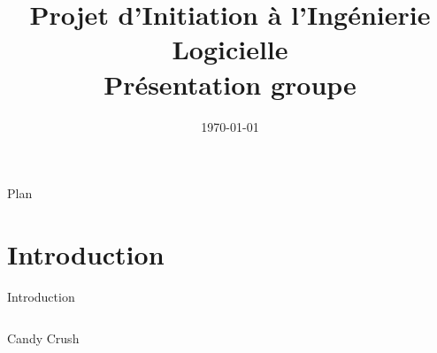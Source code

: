 \documentclass{beamer}
\title[\texorpdfstring{Projet d'Initiation à l'Ingénierie Logicielle}{}]{\texorpdfstring{Projet d'Initiation à l'Ingénierie Logicielle\\Présentation groupe \no 3}{}}
\author[\texorpdfstring{Groupe 3 : Mohamed, Émile, Théo, Alexis}{}]{\texorpdfstring{Mohamed \bsc{Lakhal} \and Émile \bsc{Jeannin} \\ \and Théo \bsc{Mottet} \and Alexis \bsc{Cabodi}}{}}
\institute[UFC]{\texorpdfstring{Université de Franche-Comté}{}}
\date{\texorpdfstring{\today}{}}
\begin{document}
\maketitle

\begin{frame}{Plan}
	\tableofcontents
\end{frame}

\section{Introduction}
\begin{frame}{Introduction}
	\begin{columns}
		\begin{column}{0.49\textwidth} %
			\begin{block}{Candy Crush}
\end{block}
\end{column}
\end{columns}
\end{frame}
\end{document}
